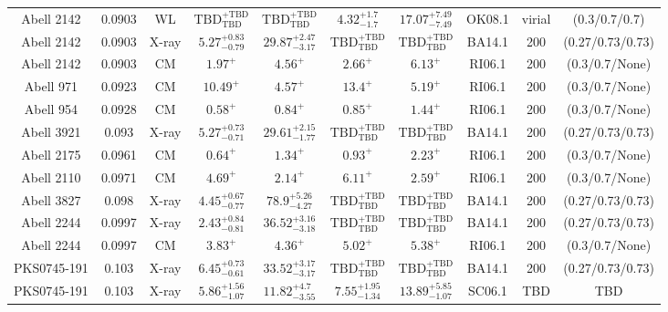 \begin{table}
\begin{tabular}{cccccccccc}
Abell 2142 & 0.0903 & WL & ${\mathrm{TBD}}^{+\mathrm{TBD}}_{\mathrm{TBD}}$ & ${\mathrm{TBD}}^{+\mathrm{TBD}}_{\mathrm{TBD}}$ & ${4.32}^{+1.7}_{-1.7}$ & ${17.07}^{+7.49}_{-7.49}$ & OK08.1 & virial & (0.3/0.7/0.7) \\
Abell 2142 & 0.0903 & X-ray & ${5.27}^{+0.83}_{-0.79}$ & ${29.87}^{+2.47}_{-3.17}$ & ${\mathrm{TBD}}^{+\mathrm{TBD}}_{\mathrm{TBD}}$ & ${\mathrm{TBD}}^{+\mathrm{TBD}}_{\mathrm{TBD}}$ & BA14.1 & 200 & (0.27/0.73/0.73) \\
Abell 2142 & 0.0903 & CM & ${1.97}^{+}_{}$ & ${4.56}^{+}_{}$ & ${2.66}^{+}_{}$ & ${6.13}^{+}_{}$ & RI06.1 & 200 & (0.3/0.7/None) \\
Abell 971 & 0.0923 & CM & ${10.49}^{+}_{}$ & ${4.57}^{+}_{}$ & ${13.4}^{+}_{}$ & ${5.19}^{+}_{}$ & RI06.1 & 200 & (0.3/0.7/None) \\
Abell 954 & 0.0928 & CM & ${0.58}^{+}_{}$ & ${0.84}^{+}_{}$ & ${0.85}^{+}_{}$ & ${1.44}^{+}_{}$ & RI06.1 & 200 & (0.3/0.7/None) \\
Abell 3921 & 0.093 & X-ray & ${5.27}^{+0.73}_{-0.71}$ & ${29.61}^{+2.15}_{-1.77}$ & ${\mathrm{TBD}}^{+\mathrm{TBD}}_{\mathrm{TBD}}$ & ${\mathrm{TBD}}^{+\mathrm{TBD}}_{\mathrm{TBD}}$ & BA14.1 & 200 & (0.27/0.73/0.73) \\
Abell 2175 & 0.0961 & CM & ${0.64}^{+}_{}$ & ${1.34}^{+}_{}$ & ${0.93}^{+}_{}$ & ${2.23}^{+}_{}$ & RI06.1 & 200 & (0.3/0.7/None) \\
Abell 2110 & 0.0971 & CM & ${4.69}^{+}_{}$ & ${2.14}^{+}_{}$ & ${6.11}^{+}_{}$ & ${2.59}^{+}_{}$ & RI06.1 & 200 & (0.3/0.7/None) \\
Abell 3827 & 0.098 & X-ray & ${4.45}^{+0.67}_{-0.77}$ & ${78.9}^{+5.26}_{-4.27}$ & ${\mathrm{TBD}}^{+\mathrm{TBD}}_{\mathrm{TBD}}$ & ${\mathrm{TBD}}^{+\mathrm{TBD}}_{\mathrm{TBD}}$ & BA14.1 & 200 & (0.27/0.73/0.73) \\
Abell 2244 & 0.0997 & X-ray & ${2.43}^{+0.84}_{-0.81}$ & ${36.52}^{+3.16}_{-3.18}$ & ${\mathrm{TBD}}^{+\mathrm{TBD}}_{\mathrm{TBD}}$ & ${\mathrm{TBD}}^{+\mathrm{TBD}}_{\mathrm{TBD}}$ & BA14.1 & 200 & (0.27/0.73/0.73) \\
Abell 2244 & 0.0997 & CM & ${3.83}^{+}_{}$ & ${4.36}^{+}_{}$ & ${5.02}^{+}_{}$ & ${5.38}^{+}_{}$ & RI06.1 & 200 & (0.3/0.7/None) \\
PKS0745-191 & 0.103 & X-ray & ${6.45}^{+0.73}_{-0.61}$ & ${33.52}^{+3.17}_{-3.17}$ & ${\mathrm{TBD}}^{+\mathrm{TBD}}_{\mathrm{TBD}}$ & ${\mathrm{TBD}}^{+\mathrm{TBD}}_{\mathrm{TBD}}$ & BA14.1 & 200 & (0.27/0.73/0.73) \\
PKS0745-191 & 0.103 & X-ray & ${5.86}^{+1.56}_{-1.07}$ & ${11.82}^{+4.7}_{-3.55}$ & ${7.55}^{+1.95}_{-1.34}$ & ${13.89}^{+5.85}_{-1.07}$ & SC06.1 & TBD & TBD \\

\end{tabular}
\end{table}

